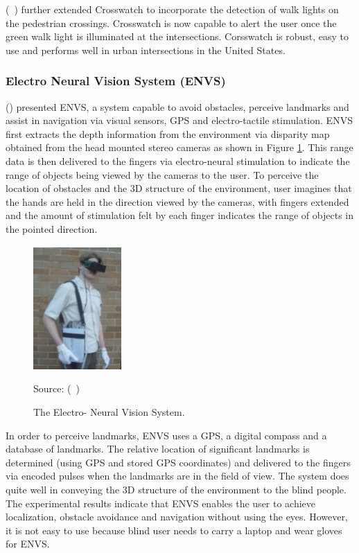  (~\cite{james10}) further extended Crosswatch 
to incorporate the detection of 
walk lights on the pedestrian crossings.
Crosswatch is now capable to alert the user 
once the green walk light is illuminated at the intersections. 
Corsswatch is robust, easy to use and performs well in urban 
intersections in the United States.


\subsubsection{Electro Neural Vision System (ENVS)}
(\citet{meers05}) presented ENVS, a system capable 
to avoid obstacles, perceive landmarks 
and assist in navigation via visual sensors, 
GPS and electro-tactile stimulation. 
ENVS first extracts the depth information from the
environment via disparity map 
obtained from the head mounted stereo cameras as shown in 
Figure \ref{fig:envs}. 
This range data is then delivered 
to the fingers via electro-neural stimulation to indicate 
the range of objects being viewed by the cameras to the 
user. To perceive the location of obstacles and the 3D structure 
of the environment, user imagines that the hands are held 
in the direction viewed by the cameras, with fingers 
extended and the amount of stimulation 
felt by each finger indicates 
the range of objects in the pointed direction. 

\begin{figure}[h!]
\centering{} \includegraphics[width=0.3\textwidth]{Images/envs.png}
\caption{\label{fig:envs} The Electro- Neural Vision System.}
\small{Source: (~\citet{meers05})}
\end{figure}

In order to perceive landmarks, 
ENVS uses a GPS, a digital compass and a database of landmarks. 
The relative location of significant 
landmarks is determined (using GPS and stored GPS 
coordinates) and delivered to the fingers via encoded pulses 
when the landmarks are in the field of view. 
The system does quite well in conveying the 
3D structure of the environment to the blind people. 
The experimental results indicate that ENVS 
enables the user to achieve localization, 
obstacle avoidance and navigation without using the eyes. 
However, it is not easy to use because 
blind user needs to carry a laptop and wear gloves 
for ENVS.


